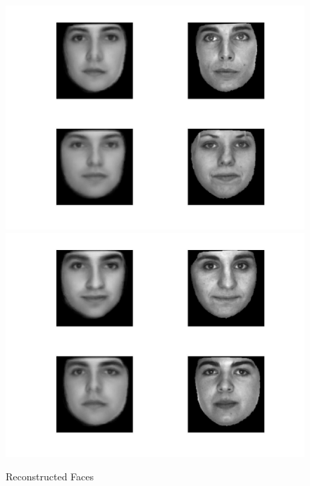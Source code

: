 \documentclass[12pt]{ctexart}
\begin{document}
\begin{enumerate}
\begin{figure}[H]
\includegraphics[scale=0.18]{c_rec_face_wf11.jpg}
\includegraphics[scale=0.18]{c_rec_face_wf12.jpg}
  \caption{Reconstructed Faces}
\end{figure}


\end{enumerate}
\end{document}
